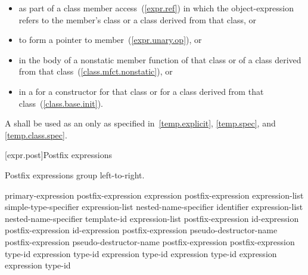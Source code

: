 \begin{itemize}
\item as part of a class member access~(\ref{expr.ref}) in which the
object-expression refers to the member's class or a class derived from
that class, or

\item to form a pointer to member~(\ref{expr.unary.op}), or

\item in the body of a nonstatic member function of that class or of a
class derived from that class~(\ref{class.mfct.nonstatic}), or

\item in a  for a constructor for that class
or for a class derived from that class~(\ref{class.base.init}).
\end{itemize}

\pnum
A  shall be used as an
 only as specified in~\ref{temp.explicit},
\ref{temp.spec}, and \ref{temp.class.spec}.

[expr.post]{Postfix expressions}%

\pnum
Postfix expressions group left-to-right.

\begin{bnf}
\br
    primary-expression\br
    postfix-expression \terminal{[} expression \terminal{]}\br
    postfix-expression \terminal{(} expression-list\opt \terminal{)}\br
    simple-type-specifier \terminal{(} expression-list\opt \terminal{)}\br
     \terminal{::}\opt nested-name-specifier identifier
	\terminal{(} expression-list\opt \terminal{)}\br
     \terminal{::}\opt nested-name-specifier
	\opt template-id
	\terminal{(} expression-list\opt \terminal{)}\br
    postfix-expression \opt id-expression\br
    postfix-expression \opt id-expression\br
    postfix-expression  pseudo-destructor-name\br
    postfix-expression \terminal{->} pseudo-destructor-name\br
    postfix-expression \terminal{++}\br
    postfix-expression \terminal{-{-}}\br
     type-id \terminal{> (} expression \terminal{)}\br
     type-id \terminal{> (} expression \terminal{)}\br
     type-id \terminal{> (} expression \terminal{)}\br
     type-id \terminal{> (} expression \terminal{)}\br
     expression \terminal{)}\br
     type-id \terminal{)}
\end{bnf}


